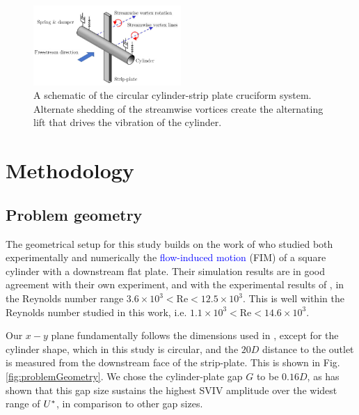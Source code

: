 \documentclass[a4paper,fleqn]{cas-sc}
\begin{document}
\begin{figure}
  \centering
  \includegraphics[width=0.5\textwidth]{figs/figure1}
  \caption{A schematic of the circular cylinder-strip plate cruciform system. Alternate shedding of the streamwise vortices create the alternating lift that drives the vibration of the cylinder.}
  \label{fig:cruciformSystemSchematic}
\end{figure}


\section{Methodology} \label{sec:method}
\subsection{Problem geometry} \label{ssec:probGeo}
The geometrical setup for this study builds on the work of \citet{Maruai2017,Maruai2018} who studied both experimentally and numerically the \textcolor{blue}{flow-induced motion} (FIM) of a square cylinder with a downstream flat plate. Their simulation results are in good agreement with their own experiment, and with the experimental results of \citet{Kawabata2013}, in the Reynolds number range $3.6\times10^{3}<\text{Re}<12.5\times10^{3}$. This is well within the Reynolds number studied in this work, i.e. $1.1\times10^{3}<\text{Re}<14.6\times10^{3}$.

Our $x-y$ plane fundamentally follows the dimensions used in \citet{Maruai2017,Maruai2018}, except for the cylinder shape, which in this study is circular, and the $20D$ distance to the outlet is measured from the downstream face of the strip-plate. This is shown in Fig. \ref{fig:problemGeometry}. We chose the cylinder-plate gap $G$ to be $0.16D$, as \citet{Koide2013} has shown that this gap size sustains the highest SVIV amplitude over the widest range of $U^{*}$, in comparison to other gap sizes.
\end{document}
